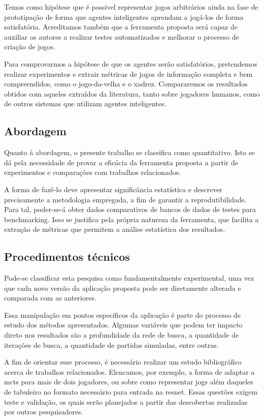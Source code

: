 \documentclass[12pt]{article}
\begin{document}
Temos como hipótese que é possível representar jogos arbitrários ainda na fase de prototipação de forma que agentes inteligentes aprendam a jogá-los de forma satisfatória.
Acreditamos também que a ferramenta proposta será capaz de auxiliar os autores a realizar testes automatizados e melhorar o processo de criação de jogos.

Para comprovarmos a hipótese de que os agentes serão satisfatórios, pretendemos realizar experimentos e extrair métricas de jogos de informação completa e bem compreendidos, como o jogo-da-velha e o xadrez.
Compararemos os resultados obtidos com aqueles extraídos da literatura, tanto sobre jogadores humanos, como de outros sistemas que utilizam agentes inteligentes.

\subsection{Abordagem}

Quanto à abordagem, o presente trabalho se classifica como quantitativo.
Isto se dá pela necessidade de provar a eficácia da ferramenta proposta a partir de experimentos e comparações com trabalhos relacionados.

A forma de fazê-lo deve apresentar significância estatística e descrever precisamente a metodologia empregada, a fim de garantir a reprodutibilidade.
Para tal, poder-se-á obter dados comparativos de bancos de dados de testes para benchmarking.
Isso se justifica pela própria natureza da ferramenta, que facilita a extração de métricas que permitem a análise estatística dos resultados.

\subsection{Procedimentos técnicos}

Pode-se classificar esta pesquisa como fundamentalmente experimental, uma vez que cada nova versão da aplicação proposta pode ser diretamente alterada e comparada com as anteriores.

Essa manipulação em pontos específicos da aplicação é parte do processo de estudo dos métodos apresentados.
Algumas variáveis que podem ter impacto direto nos resultados são a profundidade da rede de busca, a quantidade de iterações de busca, a quantidade de partidas simuladas, entre outras.

A fim de orientar esse processo, é necessário realizar um estudo bibliográfico acerca de trabalhos relacionados.
Elencamos, por exemplo, a forma de adaptar a \gls{mcts} para mais de dois jogadores, ou sobre como representar jogs além daqueles de tabuleiro no formato necessário para entrada na \gls{resnet}.
Essas questões exigem teste e validação, os quais serão planejados a partir das descobertas realizadas por outros pesquisadores.
\end{document}
